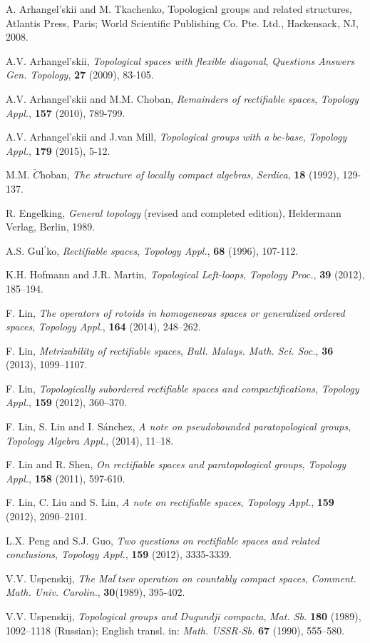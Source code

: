\documentclass[psamsfonts,fceqn,leqno]{amsart}
\theoremstyle{definition}
\begin{document}
\begin{thebibliography}{99}
 A. Arhangel'skii and M. Tkachenko,
  Topological groups and related structures, Atlantis Press, Paris; World
  Scientific Publishing Co. Pte. Ltd., Hackensack, NJ, 2008.

 A.V. Arhangel'skii, {\it Topological spaces with flexible diagonal}, {\it Questions Answers Gen. Topology},
{\bf 27} (2009), 83-105.

 A.V. Arhangel'skii and M.M. Choban,  {\it Remainders of rectifiable spaces}, {\it Topology Appl.},
{\bf 157} (2010), 789-799.

 A.V. Arhangel'skii and J.van Mill,  {\it Topological groups with a $bc$-base}, {\it Topology Appl.}, {\bf 179} (2015), 5-12.

 M.M. $\check{C}$hoban, {\it The structure of locally compact algebras}, {\it Serdica}, {\bf 18} (1992), 129-137.

 R. Engelking, {\it General topology} (revised and completed edition), Heldermann
Verlag, Berlin, 1989.

 A.S. Gul$^{\prime}$ko, {\it Rectifiable spaces}, {\it Topology Appl.}, {\bf 68} (1996), 107-112.

 K.H. Hofmann and J.R. Martin, {\it Topological Left-loops}, {\it Topology Proc.}, {\bf 39} (2012), 185--194.

 F. Lin, {\it The operators of rotoids in homogeneous spaces or generalized ordered spaces}, {\it Topology Appl.}, {\bf 164} (2014), 248--262.

 F. Lin, {\it Metrizability of rectifiable spaces}, {\it Bull. Malays. Math. Sci. Soc.}, {\bf 36} (2013), 1099--1107.

 F. Lin, {\it Topologically subordered rectifiable spaces and compactifications}, {\it Topology Appl.}, {\bf 159} (2012), 360--370.

 F. Lin, S. Lin and I. S\'{a}nchez, {\it A note on pseudobounded paratopological groups}, {\it Topology Algebra Appl.}, {\bf } (2014), 11--18.

 F. Lin and R. Shen,  {\it On rectifiable spaces and paratopological groups}, {\it Topology Appl.},
{\bf 158} (2011), 597-610.

 F. Lin, C. Liu and S. Lin,  {\it A note on rectifiable spaces}, {\it Topology Appl.}, {\bf 159} (2012), 2090--2101.

  L.X. Peng and S.J. Guo,  {\it Two questions on rectifiable spaces and related conclusions}, {\it Topology Appl.}, {\bf 159} (2012), 3335-3339.

 V.V. Uspenskij, {\it The Mal$^{\prime}$tsev operation on countably compact spaces},
 {\it Comment. Math. Univ. Carolin.}, {\bf 30}(1989), 395-402.

 V.V. Uspenskij, {\it Topological groups and Dugundji compacta}, {\it Mat. Sb.}
{\bf 180} (1989), 1092--1118 (Russian); English transl. in:
{\it Math. USSR-Sb.} {\bf 67} (1990), 555--580.
\end{thebibliography}
\end{document}
